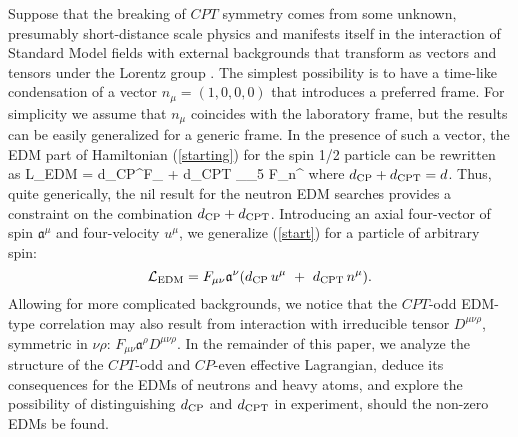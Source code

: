\documentclass[prl,twocolumn,tightenlines,preprintnumbers,floatfix,nofootinbib]{revtex4}
\begin{document}
Suppose that the breaking of $CPT$ symmetry comes from 
some unknown, presumably short-distance scale physics and 
manifests itself in the interaction of Standard Model fields with
external backgrounds that transform as vectors and tensors 
under the Lorentz group \cite{Kost,CG}. The simplest possibility
is to have a time-like condensation of a vector $n_\mu = (1,0,0,0)$
that introduces a preferred frame. For simplicity we assume that 
$n_\mu $ coincides with the laboratory frame, but the results can be easily generalized for
a generic frame. In the presence of such a vector, 
the EDM part of Hamiltonian (\ref{starting}) for the spin 1/2 particle can be rewritten 
as 
\be
{\cal L}_{\rm EDM} = d_{\rm CP}\ov \psi \sigma^{\mu\nu}F_{\mu\nu} \psi 
+ d_{\rm CPT}\ov{\psi} \gamma_\mu\gamma_5 \psi F_{\mu\nu}n^{\nu}
\label{start}
\ee
where $d_{\rm CP}+d_{\rm CPT}=d$. 
Thus, quite generically, 
the nil result for the neutron EDM searches provides a constraint on the combination 
$d_{\rm CP}+d_{\rm CPT}$.
Introducing an axial four-vector of spin $ \mathfrak{a}^\mu $ and four-velocity $u^\mu$, 
we generalize (\ref{start}) for a particle of arbitrary spin:
\begin{equation}
\label{arb_spin}
{\cal L}_{\rm EDM} =F_{\mu\nu} \mathfrak{a}^{\nu} (d_{\rm CP}\,u^\mu
	~+~
	d_{\rm CPT}\, n^\mu ).
\end{equation}
Allowing for more complicated backgrounds, we notice that the $CPT$-odd EDM-type correlation
may also result from interaction with irreducible tensor $D^{\mu\nu\rho}$, symmetric in 
$\nu\rho$: $F_{\mu\nu} \mathfrak{a}^{\rho}D^{\mu\nu\rho}$.
In the remainder of this paper, we analyze the structure of the 
$CPT$-odd and $CP$-even effective Lagrangian, deduce its consequences 
for the EDMs of neutrons and heavy atoms, and explore the possibility of 
distinguishing 
$d_{\rm CP}$ and $d_{\rm CPT}$ in experiment, should the non-zero EDMs be found. 
\end{document}
